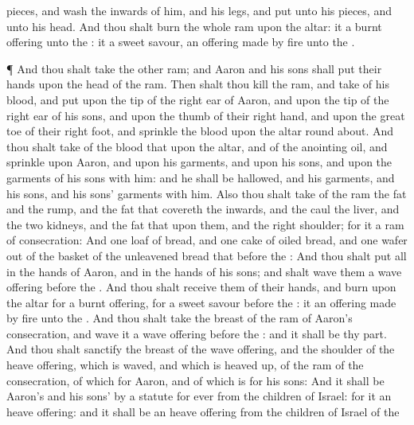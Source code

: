 {pieces, and
wash the
inwards of him, and his
legs, and
put
{} unto his
pieces, and unto his
head.
And thou shalt
burn the whole
ram upon the
altar: it
{} a burnt
offering unto the
{}: it
{} a
sweet
savour, an offering made by
fire unto the
{}.
\par }{\PP {}¶ And thou shalt
take the
other
ram; and
Aaron and his
sons shall
put their
hands upon the
head of the
ram.
Then shalt thou
kill the
ram, and
take of his
blood, and
put
{} upon the
tip of the right
ear of
Aaron, and upon the
tip of the
right
ear of his
sons, and upon the
thumb of their
right
hand, and upon the great
toe of their
right
foot, and
sprinkle the
blood upon the
altar round
about.
And thou shalt
take of the
blood that
{} upon the
altar, and of the
anointing
oil, and
sprinkle
{} upon
Aaron, and upon his
garments, and upon his
sons, and upon the
garments of his
sons with him: and he shall be
hallowed, and his
garments, and his
sons, and his
sons’
garments with him.
Also thou shalt
take of the
ram the
fat and the
rump, and the
fat that
covereth the
inwards, and the
caul
{} the
liver, and the
two
kidneys, and the
fat that
{} upon them, and the
right
shoulder; for it
{} a
ram of
consecration:
And
one
loaf of
bread, and
one
cake of
oiled bread, and
one
wafer out of the
basket of the unleavened
bread that
{}
before the
{}:
And thou shalt
put all in the
hands of
Aaron, and in the
hands of his
sons; and shalt
wave them
{} a wave
offering
before the
{}.
And thou shalt
receive them of their
hands, and
burn
{} upon the
altar for a burnt
offering, for a
sweet
savour
before the
{}: it
{} an offering made by
fire unto the
{}.
And thou shalt
take the
breast of the
ram of
Aaron’s
consecration, and
wave it
{} a wave
offering
before the
{}: and it shall be thy
part.
And thou shalt
sanctify the
breast of the wave
offering, and the
shoulder of the heave
offering, which is
waved, and which is heaved
up, of the
ram of the
consecration,
{} of
{}
which
{} for
Aaron, and of
{} which is for his
sons:
And it shall be
Aaron’s and his
sons’ by a
statute for
ever from the
children of
Israel: for it
{} an heave
offering: and it shall be an heave
offering from the
children of
Israel of the
}
